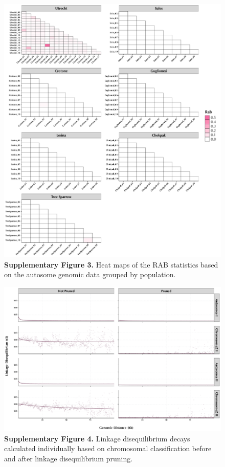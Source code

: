 \documentclass[twoside, british, a4paper]{article}
\begin{document}
\begin{figure}
\centering
\includegraphics[width=1\textwidth]{../Y150239Genomics--Pipeline/Y150239Genomics--Plots/Y150239Genomics--Kinship/Y150239Genomics--Kinship.pdf}
\captionsetup{labelformat=empty}
\caption[\textbf{Supplementary Figure 3.}]{\textbf{Supplementary Figure 3.} Heat maps of the RAB statistics based on the autosome genomic data grouped by population.}
\label{SI:Y150239Genomics--Kinship}
\end{figure}

\begin{figure}
\centering
\includegraphics[width=1\textwidth]{../Y150239Genomics--Pipeline/Y150239Genomics--Plots/Y150239Genomics--LD/Y150239Genomics--LD.pdf}
\captionsetup{labelformat=empty}
\caption[\textbf{Supplementary Figure 4.}]{\textbf{Supplementary Figure 4.} Linkage disequilibrium decays calculated individually based on chromosomal classification before and after linkage disequilibrium pruning.}
\label{SI:Y150239Genomics--LD}
\end{figure}
\end{document}
